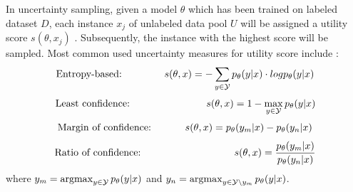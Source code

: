 In uncertainty sampling, given a model $\theta$ which has been trained on labeled dataset $D$, each instance $x_j$ of unlabeled data pool $U$ will be assigned a utility score $s(\theta, x_j)$ \cite{nguyen2021howtomeasure}.
Subsequently, the instance with the highest score will be sampled.
Most common used uncertainty measures for utility score include \cite{human-in-the-loop}:
\begin{equation}
    \text{Entropy-based:}\hspace{15mm} \label{eqn:entropy_def}
     s(\theta, x) = - \sum_{y \in \mathcal{Y}}{p_{\theta}(y | x) \cdot log p_{\theta}(y|x)}
\end{equation}
\begin{equation}
    \text{Least confidence:}\hspace{27mm} \label{eqn:least_confidence_def}
     s(\theta, x) = 1 - \max_{y \in \mathcal{Y}}{p_{\theta}(y | x)}
\end{equation}
\begin{equation}
    \text{Margin of confidence:}\hspace{12mm} \label{eqn:margin_of_confidence_def}
    s(\theta, x) = p_{\theta}(y_m | x) - p_{\theta}(y_n|x)
\end{equation}
\begin{equation} \label{eqn:ratio_of_confidence_def}
    \text{Ratio of confidence:}\hspace{33mm}
    s(\theta, x) = \frac{p_{\theta}(y_m | x)}{p_{\theta}(y_n|x)}
\end{equation}
where
$y_m = \operatorname*{argmax}_{y \in \mathcal{Y}} p_{\theta}(y | x)$ 
and 
$y_n = \operatorname*{argmax}_{y \in \mathcal{Y} \setminus y_m}{p_{\theta}(y | x)}$.

